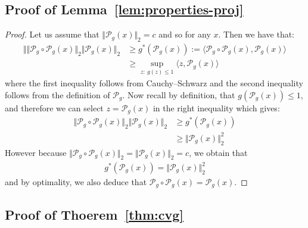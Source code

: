 \subsection{Proof of Lemma~\ref{lem:properties-proj}}


\begin{proof}
Let us assume that $\Vert\mathcal{P}_{g}(x)\Vert_2=c$ and so for any $x$. Then we have that:
\begin{align*}
    \Vert \Vert\mathcal{P}_{g}\circ \mathcal{P}_{g}(x)\Vert_2 \Vert \mathcal{P}_{g}(x) \Vert_2  &\geq g^*(\mathcal{P}_g(x)):=\langle \mathcal{P}_{g}\circ \mathcal{P}_{g}(x),\mathcal{P}_{g}(x)\rangle \\
    &\geq \sup_{z:~g(z)\leq 1} \langle z, \mathcal{P}_g(x)\rangle 
\end{align*}
where the first inequality follows from Cauchy–Schwarz and the second inequality follows from the definition of $\mathcal{P}_g$. Now recall by definition, that $g(\mathcal{P}_g(x))\leq 1 $, and therefore we can select $z=\mathcal{P}_g(x)$ in the right inequality which gives:
\begin{align*}
     \Vert\mathcal{P}_{g}\circ \mathcal{P}_{g}(x)\Vert_2 \Vert \mathcal{P}_{g}(x) \Vert_2  &\geq g^*(\mathcal{P}_g(x))\\
    &\geq \Vert \mathcal{P}_g(x)\Vert_2^2 
\end{align*}
However because $\Vert\mathcal{P}_{g}\circ \mathcal{P}_{g}(x)\Vert_2 = \Vert\mathcal{P}_{g}(x)\Vert_2 = c$, we obtain that 
\begin{align*}
    g^*(\mathcal{P}_g(x))=\Vert \mathcal{P}_g(x)\Vert_2^2
\end{align*}
and by optimality, we also deduce that $\mathcal{P}_g\circ \mathcal{P}_g(x)=\mathcal{P}_g(x)$.
\end{proof}

\subsection{Proof of Thoerem~\ref{thm:cvg}}



